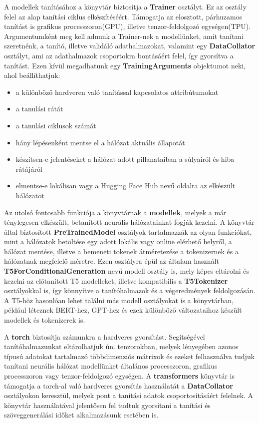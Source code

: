 A modellek tanításához a könyvtár biztosítja a \textbf{Trainer} osztályt. Ez az osztály felel az alap tanítási ciklus elkészítéséért. Támogatja az elosztott, párhuzamos tanítást is grafikus processzoron(GPU), illetve tenzor-feldolgozó egységen(TPU). Argumentumként meg kell adnunk a Trainer-nek a modellünket, amit tanítani szeretnénk, a tanító, illetve validáló adathalmazokat, valamint egy \textbf{DataCollator} osztályt, ami az adathalmazok csoportokra bontásáért felel, így gyorsítva a tanítást. Ezen kívül megadhatunk egy \textbf{TrainingArguments} objektumot neki, ahol beállíthatjuk\cite{hf}:

\begin{itemize}
\item a különböző hardveren való tanítással kapcsolatos attribútumokat
\item a tanulási rátát
\item a tanulási ciklusok számát
\item hány lépésenként mentse el a hálózat aktuális állapotát
\item készítsen-e jelentéseket a hálózat adott pillanataiban a súlyairól és hiba rátájáról
\item elmentse-e lokálisan vagy a Hugging Face Hub nevű oldalra az elkészült hálózatot
\end{itemize}

Az utolsó fontosabb funkciója a könyvtárnak a \textbf{modellek}, melyek a már ténylegesen elkészült, betanított neurális hálózatainkat fogják kezelni. A könyvtár által biztosított \textbf{PreTrainedModel} osztályok tartalmazzák az olyan funkciókat, mint a hálózatok betöltése egy adott lokális vagy online elérhető helyről, a hálózat mentése, illetve a bemeneti tokenek átméretezése a tokenizernek és a hálózatnak megfelelő méretre\cite{hf}. Ezen osztályra épül az általam használt \textbf{T5ForConditionalGeneration} nevű modell osztály is, mely képes eltárolni és kezelni az előtanított T5 modelleket, illetve kompatibilis a \textbf{T5Tokenizer} osztályokkal is, így könnyítve a tanítóhalmazok és a végeredmények feldolgozásán. A T5-höz hasonlóan lehet találni más modell osztályokat is a könyvtárban, például léteznek BERT-hez, GPT-hez és ezek különböző változataihoz készült modellek és tokenizerek is.


A \textbf{torch} biztosítja számunkra a hardveres gyorsítást. Segítségével tanítóhalmazunkat eltárolhatjuk ún. tenzorokban, melyek lényegében azonos típusú adatokat tartalmazó többdimenziós mátrixok és ezeket felhasználva tudjuk tanítani neurális hálózat modellünket általános processzoron, grafikus processzoron vagy tenzor-feldolgozó egységen. A \textbf{transformers} könyvtár is támogatja a torch-al való hardveres gyorsítás használatát a \textbf{DataCollator} osztályokon keresztül, melyek pont a tanítási adatok csoportosításáért felelnek. A könyvtár használatával jelentősen fel tudtuk gyorsítani a tanítási és szöveggenerálási időket alkalmazásunk esetében is.

